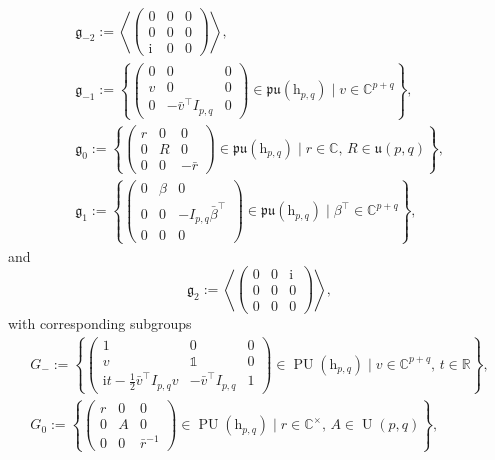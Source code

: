 \documentclass[10pt,a4paper]{amsart}
\numberwithin{equation}{section}
\theoremstyle{definition}
\DeclareMathOperator{\Utry}{\mathrm{U}}
\DeclareMathOperator{\PU}{\mathrm{PU}}
\begin{document}
\begin{gather*}
\mathfrak{g}_{-2}:=\left\langle\begin{pmatrix}0 & 0 & 0 \\ 0 & 0 & 0 \\ \mathrm{i} & 0 & 0\end{pmatrix}\right\rangle,\\
 \mathfrak{g}_{-1}:=\left\{\begin{pmatrix}0 & 0 & 0 \\ v & 0 & 0 \\ 0 & -\bar{v}^\top I_{p,q} & 0\end{pmatrix}\in\mathfrak{pu}(\mathrm{h}_{p,q})\mid v\in\mathbb{C}^{p+q}\right\},\\
 \mathfrak{g}_0:=\left\{\begin{pmatrix}r & 0 & 0 \\ 0 & R & 0 \\ 0 & 0 & -\bar{r}\end{pmatrix}\in\mathfrak{pu}(\mathrm{h}_{p,q})\mid r\in\mathbb{C},\, R\in\mathfrak{u}(p,q)\right\},\\
 \mathfrak{g}_1:=\left\{\begin{pmatrix}0 & \beta & 0 \\ 0 & 0 & -I_{p,q}\bar{\beta}^\top \\ 0 & 0 & 0\end{pmatrix}\in\mathfrak{pu}(\mathrm{h}_{p,q}) \mid \beta^\top\in\mathbb{C}^{p+q}\right\},
\end{gather*}
and
\[\mathfrak{g}_2:=\left\langle\begin{pmatrix}0 & 0 & \mathrm{i} \\ 0 & 0 & 0 \\ 0 & 0 & 0\end{pmatrix}\right\rangle,\]
with corresponding subgroups
\begin{gather*}
G_-:=\left\{\begin{pmatrix}1 & 0 & 0 \\ v & \mathds{1} & 0 \\ \mathrm{i}t-\tfrac{1}{2}\bar{v}^\top I_{p,q} v & -\bar{v}^\top I_{p,q} & 1\end{pmatrix}\in\PU(\mathrm{h}_{p,q})\mid v\in\mathbb{C}^{p+q},\, t\in\mathbb{R}\right\},\\
 G_0:=\left\{\begin{pmatrix}r & 0 & 0 \\ 0 & A & 0 \\ 0 & 0 & \bar{r}^{-1}\end{pmatrix}\in\PU(\mathrm{h}_{p,q})\mid r\in\mathbb{C}^\times,\, A\in\Utry(p,q)\right\},
 \end{gather*}
\end{document}
